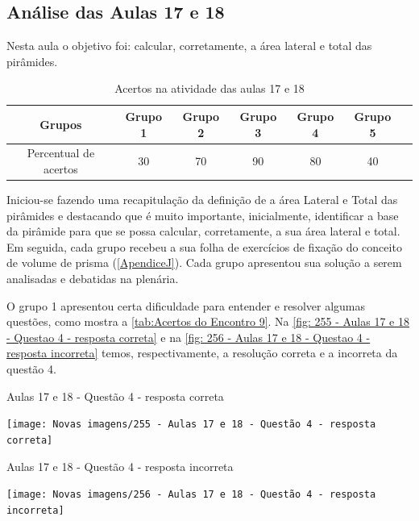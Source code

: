 \subsection{Análise das Aulas 17 e 18}

Nesta aula o objetivo foi: calcular, corretamente, a área lateral e total das pirâmides.

\begin{table}[htbp] \centering
    \caption{Acertos na atividade das aulas 17 e 18} \label{tab:Acertos do Encontro 9}
    \begin{tabular}{|c|c|c|c|c|c|c|}
        \hline
        \textbf{Grupos}       & \textbf{Grupo 1} & \textbf{Grupo 2} & \textbf{Grupo 3} & \textbf{Grupo 4} & \textbf{Grupo 5} \\
        \hline
        Percentual de acertos & 30               & 70               & 90               & 80               & 40               \\
        \hline
    \end{tabular}
    \legend{\legendaTabela}
\end{table}

Iniciou-se fazendo uma recapitulação da definição de a área Lateral e Total das pirâmides e destacando que é muito importante, inicialmente, identificar a base da pirâmide para que se possa calcular, corretamente, a sua área lateral e total. Em seguida, cada grupo recebeu a sua folha de exercícios de fixação do conceito de volume de prisma (\autoref{ApendiceJ}). Cada grupo apresentou sua solução a serem analisadas e debatidas na plenária.

O grupo 1 apresentou certa dificuldade para entender e resolver algumas questões, como mostra a \autoref{tab:Acertos do Encontro 9}. Na \autoref{fig: 255 - Aulas 17 e 18 - Questao 4 - resposta correta} e na \autoref{fig: 256 - Aulas 17 e 18 - Questao 4 - resposta incorreta} temos, respectivamente, a resolução correta e a incorreta da questão 4.

\begin{CenteredFigure}
    \caption{Aulas 17 e 18 - Questão 4 - resposta correta} \label{fig: 255 - Aulas 17 e 18 - Questao 4 - resposta correta}
    \texttt{[image: Novas imagens/255 - Aulas 17 e 18 - Questão 4 - resposta correta]}
    \legend{\autoria}
\end{CenteredFigure}

\begin{CenteredFigure}
    \caption{Aulas 17 e 18 - Questão 4 - resposta incorreta} \label{fig: 256 - Aulas 17 e 18 - Questao 4 - resposta incorreta}
    \texttt{[image: Novas imagens/256 - Aulas 17 e 18 - Questão 4 - resposta incorreta]}
    \legend{\autoria}
\end{CenteredFigure}

